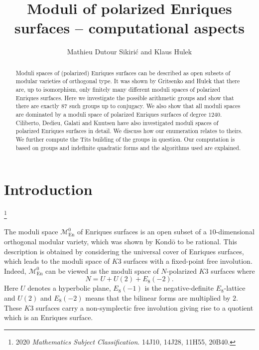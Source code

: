 \documentclass[a4paper,11pt]{article}
\newcommand{\cM}{\mathcal M}
\newcommand{\En}{\mathop{\mathrm {En}}\nolimits}
\newcommand\blfootnote[1]{
  \begingroup
  \renewcommand\thefootnote{}\footnote{#1}
  \addtocounter{footnote}{-1}
  \endgroup
}
\begin{document}
\title{Moduli of polarized Enriques surfaces -- computational aspects}
\author{Mathieu Dutour Sikiri\'c and Klaus Hulek}
\date{}
\maketitle

\begin{abstract}
Moduli spaces of (polarized) Enriques surfaces can be described as open subsets of modular varieties of orthogonal type. It was shown by Gritsenko and Hulek that there are, up to isomorphism, only finitely many
different moduli spaces of polarized Enriques surfaces. Here we investigate the possible arithmetic groups and show that there are exactly $87$ such groups up to conjugacy. We also show that all moduli spaces
are dominated by a moduli space of polarized Enriques surfaces of degree $1240$.
Ciliberto, Dedieu, Galati and Knutsen have also investigated moduli spaces of polarized Enriques surfaces in detail. We discuss how our enumeration relates to theirs.
We further compute the Tits building of the groups in question.
Our computation is based on groups and indefinite quadratic forms and the algorithms used are explained.
\end{abstract}

\section{Introduction}\label{sec:intro}
\blfootnote{
2020 \emph{Mathematics Subject Classification}. 14J10, 14J28, 11H55, 20B40.
}
The moduli space $\cM^0_{\En}$ of Enriques surfaces is an open subset of a $10$-dimensional orthogonal
modular variety, which was shown by Kond\=o \cite{Kon1} to be rational.
This description is obtained by considering the universal cover of Enriques surfaces, which leads to the moduli space of $K3$ surfaces with a fixed-point free involution. Indeed, $\cM^0_{\En}$
can be viewed as the moduli space of $N$-polarized $K3$ surfaces where
\begin{equation}\label{def:latticeN}
N = U + U(2) + E_8(-2).
\end{equation}\label{def:N}
Here $U$ denotes a hyperbolic plane, $E_8(-1)$ is the negative-definite $E_8$-lattice and
$U(2)$ and $E_8(-2)$ means that the bilinear forms are multiplied by $2$.
These $K3$ surfaces carry a non-symplectic free involution giving rise to a quotient which is an Enriques surface.
\end{document}
